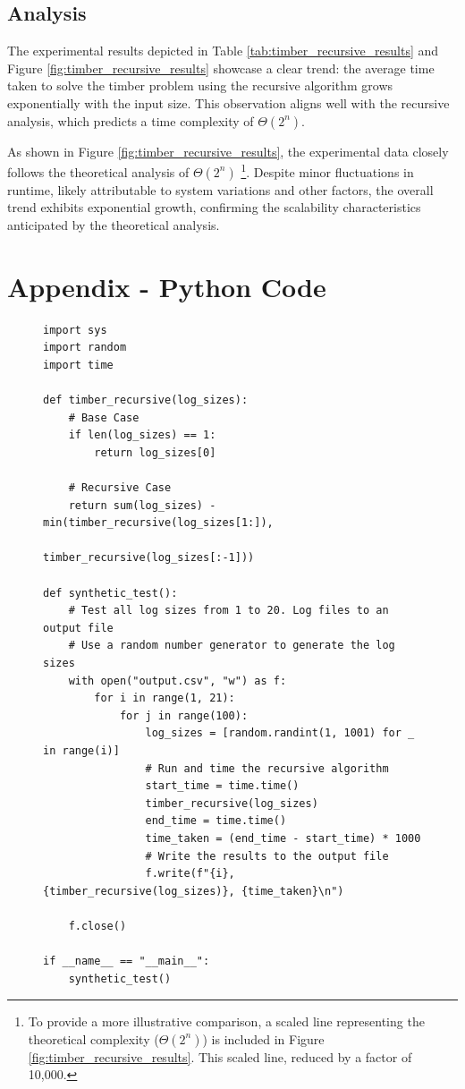\documentclass[12pt]{article}
\begin{document}
\subsection{Analysis}
The experimental results depicted in Table \ref{tab:timber_recursive_results} and Figure \ref{fig:timber_recursive_results} showcase a clear trend: the average time taken to solve the timber problem using the recursive algorithm grows exponentially with the input size. This observation aligns well with the recursive analysis, which predicts a time complexity of $\Theta (2^n)$.

As shown in Figure \ref{fig:timber_recursive_results}, the experimental data closely follows the theoretical analysis of $\Theta(2^n)$ \footnote{To provide a more illustrative comparison, a scaled line representing the theoretical complexity ($\Theta(2^n)$) is included in Figure \ref{fig:timber_recursive_results}. This scaled line, reduced by a factor of 10,000.}. Despite minor fluctuations in runtime, likely attributable to system variations and other factors, the overall trend exhibits exponential growth, confirming the scalability characteristics anticipated by the theoretical analysis.


\section{Appendix - Python Code}

\begin{figure}[H]
    \begin{verbatim}
import sys
import random
import time

def timber_recursive(log_sizes):
    # Base Case
    if len(log_sizes) == 1:
        return log_sizes[0]

    # Recursive Case
    return sum(log_sizes) - min(timber_recursive(log_sizes[1:]),
                                timber_recursive(log_sizes[:-1]))

def synthetic_test():
    # Test all log sizes from 1 to 20. Log files to an output file
    # Use a random number generator to generate the log sizes
    with open("output.csv", "w") as f:
        for i in range(1, 21):
            for j in range(100):
                log_sizes = [random.randint(1, 1001) for _ in range(i)]
                # Run and time the recursive algorithm
                start_time = time.time()
                timber_recursive(log_sizes)
                end_time = time.time()
                time_taken = (end_time - start_time) * 1000
                # Write the results to the output file
                f.write(f"{i}, {timber_recursive(log_sizes)}, {time_taken}\n")

    f.close()

if __name__ == "__main__":
    synthetic_test()
    \end{verbatim}

\end{figure}
\end{document}
